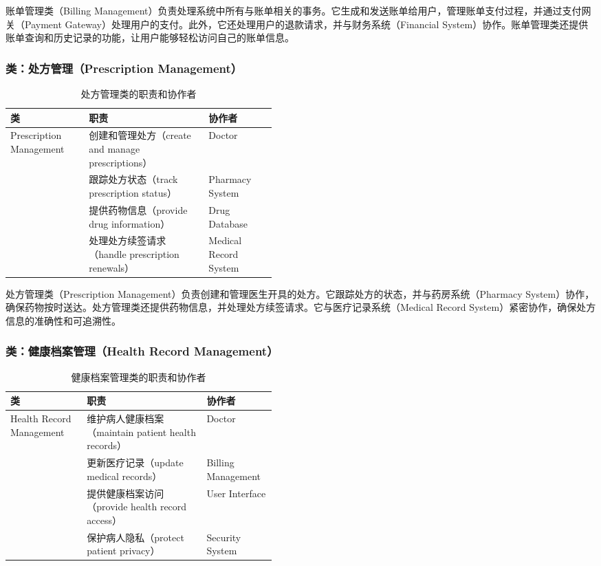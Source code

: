 账单管理类（Billing Management）负责处理系统中所有与账单相关的事务。它生成和发送账单给用户，管理账单支付过程，并通过支付网关（Payment Gateway）处理用户的支付。此外，它还处理用户的退款请求，并与财务系统（Financial System）协作。账单管理类还提供账单查询和历史记录的功能，让用户能够轻松访问自己的账单信息。

\subsubsection{类：处方管理（Prescription Management）}
\begin{table}[htbp]
	\centering
	\begin{tabular}{|l|p{0.45\linewidth}|l|}
		\hline
		\textbf{类} & \textbf{职责} & \textbf{协作者} \\
		\hline
		Prescription Management & 创建和管理处方（create and manage prescriptions） & Doctor \\
		& 跟踪处方状态（track prescription status） & Pharmacy System \\
		& 提供药物信息（provide drug information） & Drug Database \\
		& 处理处方续签请求（handle prescription renewals） & Medical Record System \\
		\hline
	\end{tabular}
	\caption{处方管理类的职责和协作者}
	\label{tab:prescription_management}
\end{table}

处方管理类（Prescription Management）负责创建和管理医生开具的处方。它跟踪处方的状态，并与药房系统（Pharmacy System）协作，确保药物按时送达。处方管理类还提供药物信息，并处理处方续签请求。它与医疗记录系统（Medical Record System）紧密协作，确保处方信息的准确性和可追溯性。

\subsubsection{类：健康档案管理（Health Record Management）}
\begin{table}[htbp]
	\centering
	\begin{tabular}{|l|p{0.45\linewidth}|l|}
		\hline
		\textbf{类} & \textbf{职责} & \textbf{协作者} \\
		\hline
		Health Record Management & 维护病人健康档案（maintain patient health records） & Doctor \\
		& 更新医疗记录（update medical records） & Billing Management \\
		& 提供健康档案访问（provide health record access） & User Interface \\
		& 保护病人隐私（protect patient privacy） & Security System \\
		\hline
	\end{tabular}
	\caption{健康档案管理类的职责和协作者}
	\label{tab:health_record_management}
\end{table}

